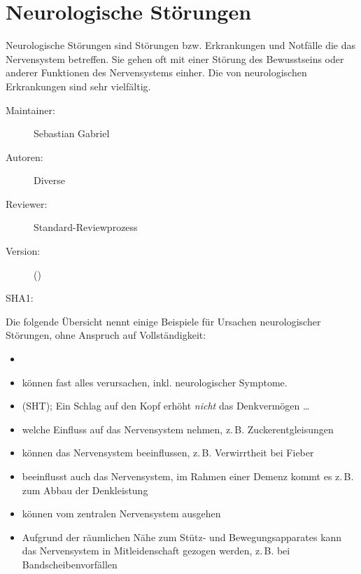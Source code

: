 \def\ChapterCode{NEU}
\chapter
[\CO{[NEU]} Neurologische Störungen]
{Neurologische Störungen}
\ChapterIntro
{%
Neurologische Störungen sind Störungen bzw.
Erkrankungen und Notfälle die das Nervensystem betreffen. Sie
gehen oft mit einer Störung des Bewusstseins oder anderer
Funktionen des Nervensystems einher. Die  von
neurologischen Erkrankungen sind sehr vielfältig. }
{%
\begin{description}
  \item[Maintainer:] Sebastian Gabriel
  \item[Autoren:] Diverse
  \item[Reviewer:] Standard-Reviewprozess
  \item[Version:] {\VarDocVersionTypeName} ({\VarDocVersionTypeDescription})
  \item[SHA1:] {\DocGitCommit}
\end{description}

{\TxTeilkapitelAASS}
}

\bigskip

\noindent Die folgende Übersicht nennt einige
Beispiele für Ursachen neurologischer Störungen, ohne
Anspruch auf Vollständigkeit:
\begin{itemize}
  \item {}
  \item {} können fast alles verursachen, inkl.
  neurologischer
  Symptome.
  \item {} (SHT); Ein Schlag auf
  den Kopf erhöht \emph{nicht} das Denkvermögen \ldots
  \item {} welche Einfluss auf das
  Nervensystem nehmen, z.\,B. Zuckerentgleisungen
  \item {} können das Nervensystem beeinflussen,
  z.\,B. Verwirrtheit bei Fieber
  \item {} beeinflusst auch das Nervensystem, im Rahmen
  einer Demenz kommt es z.\,B. zum Abbau der Denkleistung
  \item {} können vom zentralen Nervensystem ausgehen
  \item {} Aufgrund der
  räumlichen Nähe zum Stütz- und Bewegungsapparates kann das
  Nervensystem in Mitleidenschaft gezogen werden, z.\,B. bei
  Bandscheibenvorfällen
\end{itemize}


